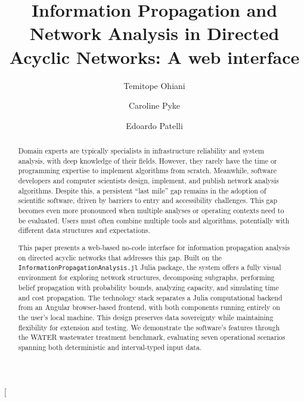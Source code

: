 \documentclass[twocolumn]{rps-esrel2026}
\begin{document}

\twocolumn[

\title{Information Propagation and Network Analysis in Directed Acyclic Networks: A web interface}

\author{Temitope Ohiani }

\address{Department of Civil and Environmental Engineering, University of Strathclyde, UK. }


\author{Caroline Pyke}

\address{United Kingdom National Nuclear Laboratory, UK. }

\author{Edoardo Patelli}
\address{Department of Civil and Environmental Engineering, University of Strathclyde, UK. }


\begin{abstract}
Domain experts are typically specialists in infrastructure reliability and system analysis, with deep knowledge of their fields. However, they rarely have the time or programming expertise to implement algorithms from scratch. Meanwhile, software developers and computer scientists design, implement, and publish network analysis algorithms. Despite this, a persistent “last mile” gap remains in the adoption of scientific software, driven by barriers to entry and accessibility challenges. This gap becomes even more pronounced when multiple analyses or operating contexts need to be evaluated. Users must often combine multiple tools and algorithms, potentially with different data structures and expectations.

This paper presents a web-based no-code interface for information propagation analysis on directed acyclic networks that addresses this gap. Built on the \texttt{InformationPropagationAnalysis.jl} Julia package, the system offers a fully visual environment for exploring network structures, decomposing subgraphs, performing belief propagation with probability bounds, analyzing capacity, and simulating time and cost propagation. The technology stack separates a Julia computational backend from an Angular browser-based frontend, with both components running entirely on the user's local machine. This design preserves data sovereignty while maintaining flexibility for extension and testing. We demonstrate the software’s features through the WATER wastewater treatment benchmark, evaluating seven operational scenarios spanning both deterministic and interval-typed input data.
\end{abstract}
\end{document}
